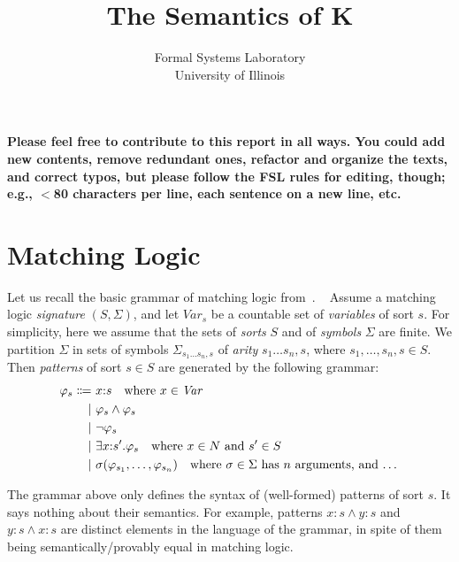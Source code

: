 \documentclass[UTF8]{article}
\title{The Semantics of K}
\author{Formal Systems Laboratory \\
          University of Illinois}
\newcommand{\comment}[1]
    {\par {\bfseries \color{blue} #1 \par}} %
\theoremstyle{plain}
\theoremstyle{definition}
\theoremstyle{remark}
\newcommand{\cln}{{:}}
\begin{document}
\maketitle

\comment{Please feel free to contribute to this report in all ways.
You could add new contents, remove redundant ones, refactor and
organize the texts, and correct typos, but please follow the FSL rules for editing, though; e.g., $<$80 characters per line,
each sentence on a new line, etc. }

\section{Matching Logic}

\newcommand{\Var}{\textit{Var}}
\newcommand{\Nat}{\textit{Nat}}

Let us recall the basic grammar of matching logic
from~\cite{rosu-2017-lmcs}.
~
Assume a matching logic \emph{signature} $(S, \Sigma)$, and
let $\Var_s$ be a countable set of
\emph{variables} of sort $s$.
For simplicity, here we assume that the sets of \emph{sorts} $S$
and of \emph{symbols} $\Sigma$ are finite.
We partition $\Sigma$ in sets of symbols
$\Sigma_{s_1 \ldots s_n, s}$ of \emph{arity} $s_1\ldots s_n,s$, where
$s_1,\ldots, s_n, s \in S$.
Then \emph{patterns} of sort $s \in S$ are generated by the following grammar:
\begin{align*}
\varphi_s \Coloneqq\  &x \cln s \quad \text{where $x \in \Var$} \\
\mid\  &\varphi_s \wedge \varphi_s \\
\mid\  &\neg \varphi_s \\
\mid\  &\exists x \cln s' . \varphi_s \quad \text{where $x \in N$ and $s' \in S$} \\
\mid\  &\sigma(\varphi_{s_1},\dots,\varphi_{s_n}) \quad \text{where $\sigma \in \Sigma$ has $n$ arguments, and \dots}
\end{align*}
\begingroup\vspace*{-\baselineskip}
\label{ml-grammar}
\vspace*{\baselineskip}\endgroup

The grammar above only defines the syntax of (well-formed) patterns of sort
$s$.
It says nothing about their semantics.
For example, patterns $x\cln s \wedge y \cln s$ and
$y\cln s \wedge x \cln s$ are distinct elements in the language
of the grammar, in spite of them being semantically/provably equal
in matching logic.
\end{document}
